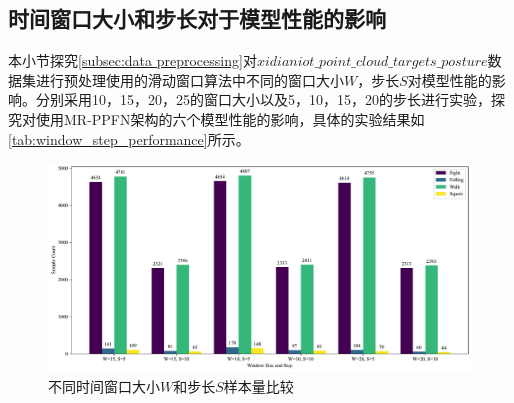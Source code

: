 \subsection{时间窗口大小和步长对于模型性能的影响}
本小节探究\eqref{subsec:data preprocessing}对$xidianiot\_point\_cloud\_targets\_posture$数据集进行预处理使用的滑动窗口算法中不同的窗口大小$W$，步长$S$对模型性能的影响。分别采用10，15，20，25的窗口大小以及5，10，15，20的步长进行实验，探究对使用MR-PPFN架构的六个模型性能的影响，具体的实验结果如\eqref{tab:window_step_performance}所示。

\begin{figure}[htbp] 
    \centering
    \includegraphics[width=1\linewidth]{imgs/window_step_sample_quantities_comparison.pdf}
    \caption{不同时间窗口大小$𝑊$和步长$𝑆$样本量比较}
    \label{fig:window_step_sample_quantities_comparison}
\end{figure}

